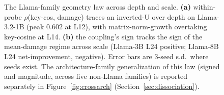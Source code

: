 \begin{figure}[t]
\centering

\caption{The Llama-family geometry law across depth and scale.
\textbf{(a)} within-probe $\rho$(key-cos, damage) traces an inverted-U over
depth on Llama-3.2-1B (peak $0.602$ at L12), with matrix-norm-growth
overtaking key-cosine at L14. \textbf{(b)} the coupling's sign tracks the
sign of the mean-damage regime across scale (Llama-3B L24 positive;
Llama-8B L24 net-improvement, negative). Error bars are 3-seed s.d.\ where
seeds exist. The architecture-family generalization of this law (signed and
magnitude, across five non-Llama families) is reported separately in
Figure~\ref{fig:crossarch} (Section~\ref{sec:dissociation}).}
\label{fig:layerlaw}
\end{figure}
